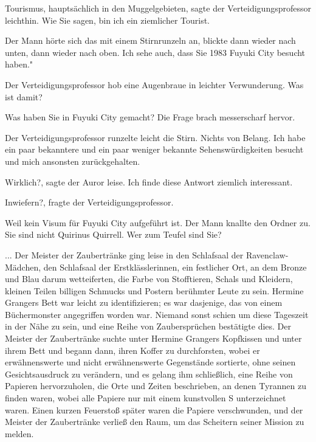 \glqq{}Tourismus, hauptsächlich in den Muggelgebieten\grqq{}, sagte der
Verteidigungsprofessor leichthin. \glqq{}Wie Sie sagen, bin ich ein ziemlicher
Tourist.\grqq{}

Der Mann hörte sich das mit einem Stirnrunzeln an, blickte dann wieder nach
unten, dann wieder nach oben. \glqq{}Ich sehe auch, dass Sie 1983 Fuyuki City
besucht haben."

Der Verteidigungsprofessor hob eine Augenbraue in leichter Verwunderung. \glqq
Was ist damit?\grqq{}

\glqq{}Was haben Sie in Fuyuki City gemacht?\grqq{} Die Frage brach messerscharf
hervor.

Der Verteidigungsprofessor runzelte leicht die Stirn. \glqq{}Nichts von Belang.
Ich habe ein paar bekanntere und ein paar weniger bekannte Sehenswürdigkeiten
besucht und mich ansonsten zurückgehalten.\grqq{}

\glqq{}Wirklich?\grqq{}, sagte der Auror leise. \glqq{}Ich finde diese Antwort
ziemlich interessant.\grqq{}

\glqq{}Inwiefern?\grqq{}, fragte der Verteidigungsprofessor.

\glqq{}Weil kein Visum für Fuyuki City aufgeführt ist.\grqq{} Der Mann knallte
den Ordner zu. \glqq{}Sie sind nicht Quirinus Quirrell. Wer zum Teufel sind
Sie?\grqq{}

... Der Meister der Zaubertränke ging leise in den Schlafsaal der
Ravenclaw-Mädchen, den Schlafsaal der Erstklässlerinnen, ein festlicher Ort, an
dem Bronze und Blau darum wetteiferten, die Farbe von Stofftieren, Schals und
Kleidern, kleinen Teilen billigen Schmucks und Postern berühmter Leute zu sein.
Hermine Grangers Bett war leicht zu identifizieren; es war dasjenige, das von
einem Büchermonster angegriffen worden war. Niemand sonst schien um diese
Tageszeit in der Nähe zu sein, und eine Reihe von Zaubersprüchen bestätigte
dies. Der Meister der Zaubertränke suchte unter Hermine Grangers Kopfkissen und
unter ihrem Bett und begann dann, ihren Koffer zu durchforsten, wobei er
erwähnenswerte und nicht erwähnenswerte Gegenstände sortierte, ohne seinen
Gesichtsausdruck zu verändern, und es gelang ihm schließlich, eine Reihe von
Papieren hervorzuholen, die Orte und Zeiten beschrieben, an denen Tyrannen zu
finden waren, wobei alle Papiere nur mit einem kunstvollen \glqq{}S\grqq{}
unterzeichnet waren. Einen kurzen Feuerstoß später waren die Papiere
verschwunden, und der Meister der Zaubertränke verließ den Raum, um das
Scheitern seiner Mission zu melden.

